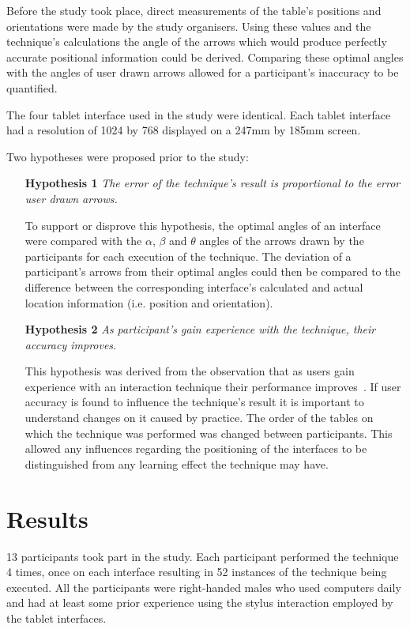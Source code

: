 \documentclass{bmcart}
\begin{document}
Before the study took place, direct measurements of the table's positions and orientations were made by the study organisers.
Using these values and the technique's calculations the angle of the arrows which would produce perfectly accurate positional information could be derived.
Comparing these optimal angles with the angles of user drawn arrows allowed for a participant's inaccuracy to be quantified.

The four tablet interface used in the study were identical.
Each tablet interface had a resolution of 1024 by 768 displayed on a 247mm by 185mm screen.

Two hypotheses were proposed prior to the study:

\begin{itemize}
\item[\textbf{Hypothesis 1}] {\emph{The error of the technique's result is proportional to the error user drawn arrows.}}

To support or disprove this hypothesis, the optimal angles of an interface were compared with the $\alpha$, $\beta$ and $\theta$ angles of the arrows drawn by the participants for each execution of the technique.
The deviation of a participant's arrows from their optimal angles could then be compared to the difference between the corresponding interface's calculated and actual location information (i.e. position and orientation).

\item[\textbf{Hypothesis 2}] {\emph{As participant's gain experience with the technique, their accuracy improves.}}

This hypothesis was derived from the observation that as users gain experience with an interaction technique their performance improves~\cite{Constantine1999}.
If user accuracy is found to influence the technique's result it is important to understand changes on it caused by practice.
The order of the tables on which the technique was performed was changed between participants.
This allowed any influences regarding the positioning of the interfaces to be distinguished from any learning effect the technique may have.
\end{itemize}


\section*{Results}\label{sec:results}  

13 participants took part in the study.
Each participant performed the technique 4 times, once on each interface resulting in 52 instances of the technique being executed.
All the participants were right-handed males who used computers daily and had at least some prior experience using the stylus interaction employed by the tablet interfaces.
\end{document}
